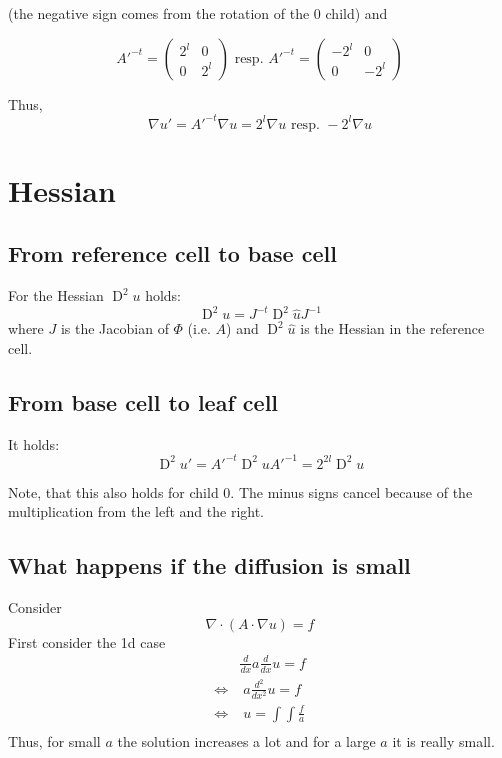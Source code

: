 \documentclass[a4paper,11pt]{article}
\newcommand{\D}{\operatorname{D}}
\begin{document}
(the negative sign comes from the rotation of the 0 child) and

\[
A'^{-t} = \begin{pmatrix}  {2^l} & 0 \\ 0 & {2^l}\end{pmatrix} \text{ resp. } A'^{-t} = \begin{pmatrix}  -{2^l} & 0 \\ 0 & -{2^l}\end{pmatrix}
\]


Thus, 
\[\nabla u'  = A'^{-t} \nabla u  = 2^l \nabla u \text { resp. } -2^l \nabla u\]

\section*{Hessian}

\subsection*{From reference cell to base cell}
For the Hessian $\D^2 u$ holds:
\[\D^2u = J^{-t} \D^2\hat u J^{-1}\]
where $J$ is the Jacobian of $\Phi$ (i.e. $A$) and $\D^2\hat u$ is the Hessian in the reference cell.

\subsection*{From base cell to leaf cell}
It holds:
\[\D^2u' = A'^{-t} \D^2 u A'^{-1} = 2^{2l} \D^2 u\]

Note, that this also holds for child 0. The minus signs cancel because of the multiplication from the left and the right.

\subsection*{What happens if the diffusion is small}
Consider
\[
	\nabla \cdot (A \cdot \nabla u) = f
\]
First consider the 1d case
\begin{align*}
	&\frac {d} {dx} a \frac {d} {dx}  u = f \\
	\Leftrightarrow &\; a \frac {d^2}{dx^2} u = f	\\
	\Leftrightarrow &\; u = \int \int \frac f	a\\
\end{align*}
Thus, for small $a$ the solution increases a lot and for a large $a$ it is really small.
\end{document}
